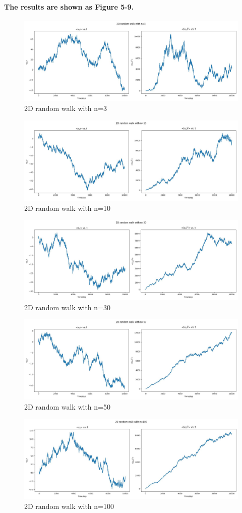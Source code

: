 \documentclass{article}
\begin{document}
\paragraph{
The results are shown as Figure 5-9.
}
\begin{figure}[htbp]
    \centering
    \includegraphics[width=0.5\linewidth]{Part2_1_n=3.jpeg}
    \caption{2D random walk with n=3}
\end{figure}
\begin{figure}[htbp]
    \centering
    \includegraphics[width=0.5\linewidth]{Part2_1_n=10.jpeg}
    \caption{2D random walk with n=10}
\end{figure}
\begin{figure}[htbp]
    \centering
    \includegraphics[width=0.5\linewidth]{Part2_1_n=30.jpeg}
    \caption{2D random walk with n=30}
\end{figure}
\begin{figure}[htbp]
    \centering
    \includegraphics[width=0.5\linewidth]{Part2_1_n=50.jpeg}
    \caption{2D random walk with n=50}
\end{figure}
\begin{figure}[htbp]
    \centering
    \includegraphics[width=0.5\linewidth]{Part2_1_n=100.jpeg}
    \caption{2D random walk with n=100}
\end{figure}
\end{document}
